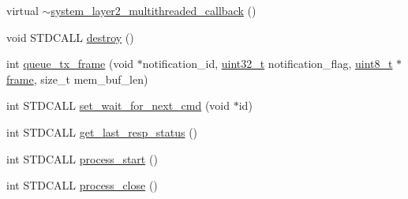 \begin{DoxyCompactItemize}
\item 
virtual \hyperlink{classavdecc__lib_1_1system__layer2__multithreaded__callback_a5568a082fc91a8afb91d4b1982d816fc}{$\sim$system\+\_\+layer2\+\_\+multithreaded\+\_\+callback} ()
\item 
void S\+T\+D\+C\+A\+LL \hyperlink{classavdecc__lib_1_1system__layer2__multithreaded__callback_a644cfaa829dbec5c28d5d29a6789e8c4}{destroy} ()
\item 
int \hyperlink{classavdecc__lib_1_1system__layer2__multithreaded__callback_ae99ddb9003d119d56bd3be4db55f5320}{queue\+\_\+tx\+\_\+frame} (void $\ast$notification\+\_\+id, \hyperlink{parse_8c_a6eb1e68cc391dd753bc8ce896dbb8315}{uint32\+\_\+t} notification\+\_\+flag, \hyperlink{stdint_8h_aba7bc1797add20fe3efdf37ced1182c5}{uint8\+\_\+t} $\ast$\hyperlink{gst__avb__playbin_8c_ac8e710e0b5e994c0545d75d69868c6f0}{frame}, size\+\_\+t mem\+\_\+buf\+\_\+len)
\item 
int S\+T\+D\+C\+A\+LL \hyperlink{classavdecc__lib_1_1system__layer2__multithreaded__callback_a278bd918301de3c19d22e7d1d906f159}{set\+\_\+wait\+\_\+for\+\_\+next\+\_\+cmd} (void $\ast$id)
\item 
int S\+T\+D\+C\+A\+LL \hyperlink{classavdecc__lib_1_1system__layer2__multithreaded__callback_ac0f9c7a224fa2168344a9a819bba69f9}{get\+\_\+last\+\_\+resp\+\_\+status} ()
\item 
int S\+T\+D\+C\+A\+LL \hyperlink{classavdecc__lib_1_1system__layer2__multithreaded__callback_a7cdc6ee6ffa37cab6b8e9fe82174ca7d}{process\+\_\+start} ()
\item 
int S\+T\+D\+C\+A\+LL \hyperlink{classavdecc__lib_1_1system__layer2__multithreaded__callback_ac508c1f6e533b4d9c26562223a4904da}{process\+\_\+close} ()
\end{DoxyCompactItemize}
